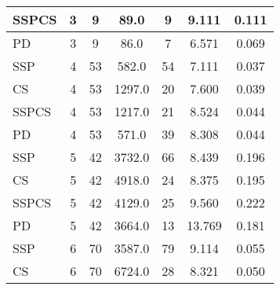 \documentclass{article}
\begin{document}
\begin{table}[H]
{\begin{tabular}{|l|c|c|c|c|c|c|}
SSPCS              & 3              & 9                 & 89.0                   & 9              & 9.111                    & 0.111                                  \\ \hline
PD                 & 3              & 9                 & 86.0                   & 7              & 6.571                    & 0.069                                  \\ \hline
\hhline{|=======|}
SSP                & 4              & 53                & 582.0                  & 54             & 7.111                    & 0.037                                  \\ \hline
CS                 & 4              & 53                & 1297.0                 & 20             & 7.600                    & 0.039                                  \\ \hline
SSPCS              & 4              & 53                & 1217.0                 & 21             & 8.524                    & 0.044                                  \\ \hline
PD                 & 4              & 53                & 571.0                  & 39             & 8.308                    & 0.044                                  \\ \hline
\hhline{|=======|}
SSP                & 5              & 42                & 3732.0                 & 66             & 8.439                    & 0.196                                  \\ \hline
CS                 & 5              & 42                & 4918.0                 & 24             & 8.375                    & 0.195                                  \\ \hline
SSPCS              & 5              & 42                & 4129.0                 & 25             & 9.560                    & 0.222                                  \\ \hline
PD                 & 5              & 42                & 3664.0                 & 13             & 13.769                   & 0.181                                  \\ \hline
\hhline{|=======|}
SSP                & 6              & 70                & 3587.0                 & 79             & 9.114                    & 0.055                                  \\ \hline
CS                 & 6              & 70                & 6724.0                 & 28             & 8.321                    & 0.050                                  \\ \hline

\end{tabular}}
\end{table}
\end{document}
